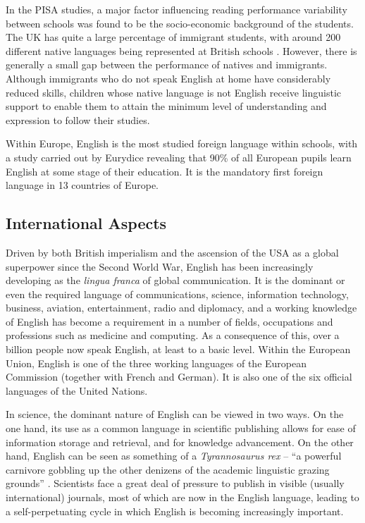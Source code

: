 \documentclass[]{../../metanetpaper}
\begin{document}
\begin{multicols}{2}
In the PISA studies, a major factor influencing reading performance variability between schools was found to be the socio-economic background of the students. The UK has quite a large percentage of immigrant students, with around 200 different native languages being represented at British schools \cite{Leg1}. However, there is generally a small gap between the performance of natives and immigrants. Although immigrants who do not speak English at home have considerably reduced skills, children whose native language is not English receive linguistic support to enable them to attain the minimum level of understanding and expression to follow their studies.

Within Europe, English is the most studied foreign language within schools, with a study carried out by Eurydice \cite{ecea} revealing that 90\% of all European pupils learn English at some stage of their education. It is the mandatory first foreign language in 13 countries of Europe. 


\subsection{International Aspects}

Driven by both British imperialism and the ascension of the USA as a global superpower since the Second World War, English has been increasingly developing as the \textit{lingua franca} of global communication. It is the dominant or even the required language of communications, science, information technology, business, aviation, entertainment, radio and diplomacy, and a working knowledge of English has become a requirement in a number of fields, occupations and professions such as medicine and computing. As a consequence of this, over a billion people now speak English, at least to a basic level. Within the European Union, English is one of the three working languages of the European Commission (together with French and German). It is also one of the six official languages of the United Nations.  
    
     
In science, the dominant nature of English can be viewed in two ways. On the one hand, its use as a common language in scientific publishing allows for ease of information storage and retrieval, and for knowledge advancement. On the other hand, English can be seen as something of a \textit{Tyrannosaurus rex} -- ``a powerful carnivore gobbling up the other denizens of the academic linguistic grazing grounds'' \cite{swales}. Scientists face a great deal of pressure to publish in visible (usually international) journals, most of which are now in the English language, leading to a self-perpetuating cycle in which English is becoming increasingly important. 
    

\end{multicols}
\end{document}
